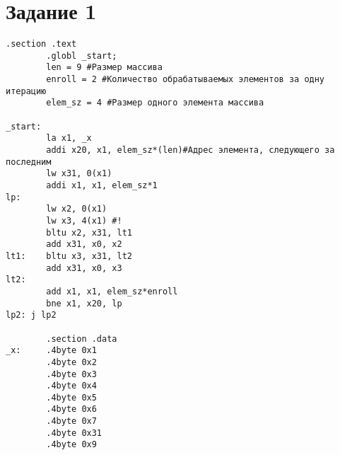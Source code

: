 \chapter{Задание 1}
\label{cha:design}

\begin{lstlisting}[label=code:source_1, caption=Листинг исходной программы]
        .section .text
		.globl _start;
		len = 9 #Размер массива
		enroll = 2 #Количество обрабатываемых элементов за одну итерацию
		elem_sz = 4 #Размер одного элемента массива

_start:
		la x1, _x
		addi x20, x1, elem_sz*(len)#Адрес элемента, следующего за последним
		lw x31, 0(x1)
		addi x1, x1, elem_sz*1
lp:
		lw x2, 0(x1)
		lw x3, 4(x1) #!
		bltu x2, x31, lt1
		add x31, x0, x2
lt1:    bltu x3, x31, lt2
		add x31, x0, x3
lt2:
		add x1, x1, elem_sz*enroll
		bne x1, x20, lp
lp2: j lp2

		.section .data
_x:     .4byte 0x1
		.4byte 0x2
		.4byte 0x3
		.4byte 0x4
		.4byte 0x5
		.4byte 0x6
		.4byte 0x7
		.4byte 0x31
		.4byte 0x9
\end{lstlisting}

